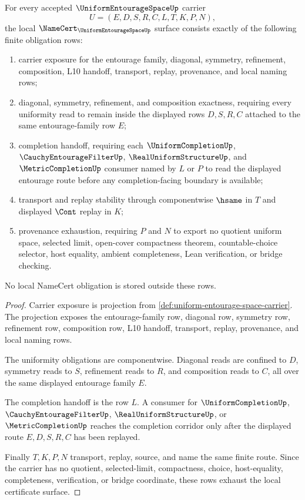 \begin{theorem}
\label{thm:uniform-entourage-space-namecert-obligations}
For every accepted $\UniformEntourageSpaceUp$ carrier
$$
U=(E,D,S,R,C,L,T,K,P,N),
$$
the local $\NameCert_{\UniformEntourageSpaceUp}$ surface consists exactly of the following finite obligation rows:
\begin{enumerate}
\item carrier exposure for the entourage family, diagonal, symmetry, refinement, composition, L10 handoff, transport, replay, provenance, and local naming rows;
\item diagonal, symmetry, refinement, and composition exactness, requiring every uniformity read to remain inside the displayed rows $D,S,R,C$ attached to the same entourage-family row $E$;
\item completion handoff, requiring each $\UniformCompletionUp$, $\CauchyEntourageFilterUp$, $\RealUniformStructureUp$, and $\MetricCompletionUp$ consumer named by $L$ or $P$ to read the displayed entourage route before any completion-facing boundary is available;
\item transport and replay stability through componentwise $\hsame$ in $T$ and displayed $\Cont$ replay in $K$;
\item provenance exhaustion, requiring $P$ and $N$ to export no quotient uniform space, selected limit, open-cover compactness theorem, countable-choice selector, host equality, ambient completeness, Lean verification, or bridge checking.
\end{enumerate}
No local NameCert obligation is stored outside these rows.
\end{theorem}
\begin{proof}
Carrier exposure is projection from \autoref{def:uniform-entourage-space-carrier}. The projection exposes the entourage-family row, diagonal row, symmetry row, refinement row, composition row, L10 handoff, transport, replay, provenance, and local naming rows.

The uniformity obligations are componentwise. Diagonal reads are confined to $D$, symmetry reads to $S$, refinement reads to $R$, and composition reads to $C$, all over the same displayed entourage family $E$.

The completion handoff is the row $L$. A consumer for $\UniformCompletionUp$, $\CauchyEntourageFilterUp$, $\RealUniformStructureUp$, or $\MetricCompletionUp$ reaches the completion corridor only after the displayed route $E,D,S,R,C$ has been replayed.

Finally $T,K,P,N$ transport, replay, source, and name the same finite route. Since the carrier has no quotient, selected-limit, compactness, choice, host-equality, completeness, verification, or bridge coordinate, these rows exhaust the local certificate surface.
\end{proof}


